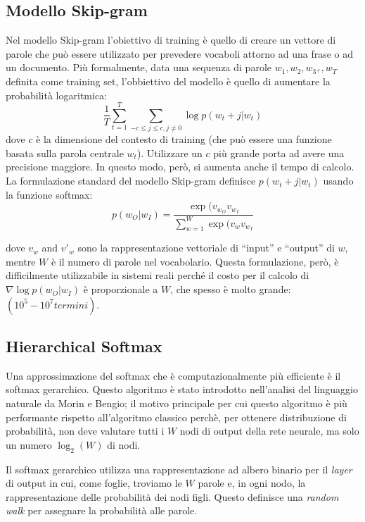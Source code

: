 \documentclass[a4paper,12pt,openright,twoside]{report}
\theoremstyle{definition}
\begin{document}
\subsection{Modello Skip-gram}
Nel modello Skip-gram l'obiettivo di training è quello di creare un vettore di parole che
può essere utilizzato per prevedere vocaboli attorno ad una frase o ad un documento. Più formalmente,
data una sequenza di parole $w_1,w_2,w_3,\dot{},w_T$ definita come training set, 
l'obbiettivo del modello è quello di aumentare la
probabilità logaritmica:
\begin{equation}
	\frac{1}{T} \sum_{t=1}^{T} \sum_{-c\leq j\leq c,j\neq0} \log p(w_t+j|w_t)
	\label{eq:prob log}
\end{equation}
dove $c$ è la dimensione del contesto di training (che può essere una funzione basata sulla parola centrale $w_t$).
Utilizzare un $c$ più grande porta ad avere una precisione maggiore. In questo modo, però, si aumenta anche il 
tempo di calcolo. La formulazione standard del modello Skip-gram definisce $p(w_t+j|w_t)$ usando la funzione
softmax:
\begin{equation}
	p(w_O|w_I) = \frac{\exp(v_{w_O} v_{w_I}}{\sum_{w=1}^{W}\exp(v_w v_{w_I}}
	\label{eq:softmax}
\end{equation}

dove $v_w$ and $v'_w$ sono la rappresentazione vettoriale di ``input'' e ``output'' di $w$, mentre $W$ è il numero
di parole nel vocabolario.
Questa formulazione, però, è difficilmente utilizzabile in sistemi reali
perché il costo per il calcolo di $\nabla\log p(w_O|w_I)$
è proporzionale a $W$, che spesso è molto grande: $(10^5-10^7 termini)$.

\subsection{Hierarchical Softmax}
Una approssimazione del softmax che è computazionalmente più efficiente è il softmax gerarchico. Questo algoritmo
è stato introdotto nell'analisi del linguaggio naturale da Morin e Bengio; il motivo principale
per cui questo algoritmo è più performante rispetto all'algoritmo classico
perchè, per ottenere distribuzione di probabilità, non deve valutare tutti i $W$
 nodi di output della rete neurale, ma solo un numero  $\log_2(W)$ di nodi.

Il softmax gerarchico utilizza una rappresentazione ad albero binario per il \emph{layer} di output 
in cui, come foglie,
troviamo le $W$ parole e, in ogni nodo, la rappresentazione delle probabilità dei nodi figli.
Questo definisce una \emph{random walk} per assegnare la probabilità alle parole.
\end{document}
